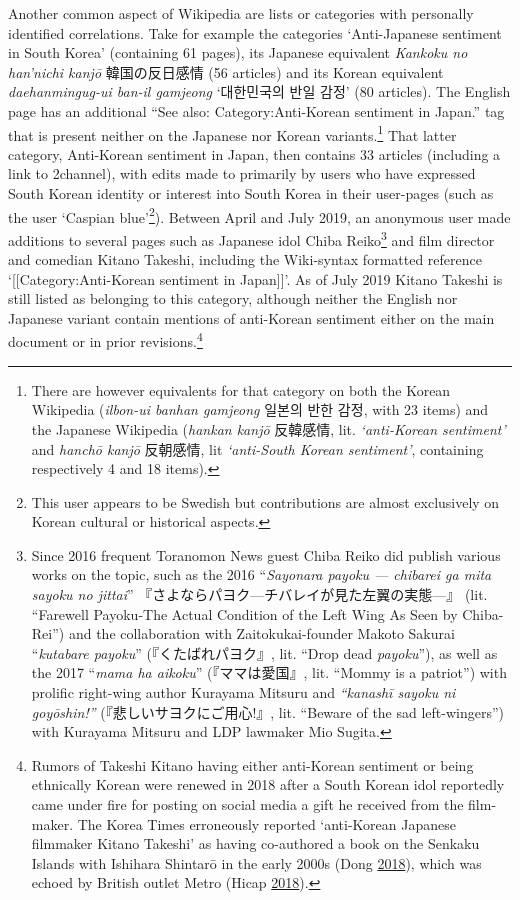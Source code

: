 \documentclass[10pt,british,A4paper,oneside]{memoir}
\begin{document}
Another common aspect of Wikipedia are lists or categories with
personally identified correlations. Take for example the categories
`Anti-Japanese sentiment in South Korea' (containing 61 pages), its
Japanese equivalent \emph{Kankoku no han'nichi kanjō} 韓国の反日感情 (56
articles) and its Korean equivalent \emph{daehanmingug-ui ban-il
gamjeong} `대한민국의 반일 감정' (80 articles). The English page has an
additional ``See also: Category:Anti-Korean sentiment in Japan.'' tag
that is present neither on the Japanese nor Korean variants.\footnote{There
  are however equivalents for that category on both the Korean Wikipedia
  (\emph{ilbon-ui banhan gamjeong} 일본의 반한 감정, with 23 items) and
  the Japanese Wikipedia (\emph{hankan kanjō} 反韓感情, lit.
  \emph{`anti-Korean sentiment'} and \emph{hanchō kanjō} 反朝感情, lit
  \emph{`anti-South Korean sentiment'}, containing respectively 4 and 18
  items).} That latter category, Anti-Korean sentiment in Japan, then
contains 33 articles (including a link to 2channel), with edits made to
primarily by users who have expressed South Korean identity or interest
into South Korea in their user-pages (such as the user `Caspian
blue'\footnote{This user appears to be Swedish but contributions are
  almost exclusively on Korean cultural or historical aspects.}).
Between April and July 2019‎, an anonymous user made additions to
several pages such as Japanese idol Chiba Reiko\footnote{Since 2016
  frequent Toranomon News guest Chiba Reiko did publish various works on
  the topic, such as the 2016 ``\emph{Sayonara payoku — chibarei ga mita
  sayoku no jittai}'' 『さよならパヨク---チバレイが見た左翼の実態---』
  (lit. ``Farewell Payoku-The Actual Condition of the Left Wing As Seen
  by Chiba-Rei'') and the collaboration with Zaitokukai-founder Makoto
  Sakurai ``\emph{kutabare payoku}'' (『くたばれパヨク』, lit. ``Drop
  dead \emph{payoku}''), as well as the 2017 ``\emph{mama ha aikoku}''
  (『ママは愛国』, lit. ``Mommy is a patriot'') with prolific right-wing
  author Kurayama Mitsuru and \emph{``kanashī sayoku ni goyōshin!''}
  (『悲しいサヨクにご用心!』, lit. ``Beware of the sad left-wingers'')
  with Kurayama Mitsuru and LDP lawmaker Mio Sugita.} and film director
and comedian Kitano Takeshi, including the Wiki-syntax formatted
reference `{[}{[}Category:Anti-Korean sentiment in Japan{]}{]}'. As of
July 2019 Kitano Takeshi is still listed as belonging to this category,
although neither the English nor Japanese variant contain mentions of
anti-Korean sentiment either on the main document or in prior
revisions.\footnote{Rumors of Takeshi Kitano having either anti-Korean
  sentiment or being ethnically Korean were renewed in
  2018 after a South Korean idol reportedly came under fire for posting
  on social media a gift he received from the film-maker. The Korea
  Times erroneously reported `anti-Korean Japanese filmmaker Kitano
  Takeshi' as having co-authored a book on the Senkaku Islands with
  Ishihara Shintarō in the early 2000s (Dong
  \protect\hyperlink{ref-dong_ikon_2018}{2018}), which was echoed by
  British outlet Metro (Hicap
  \protect\hyperlink{ref-hicap_ikons_2018}{2018}).}
\end{document}
